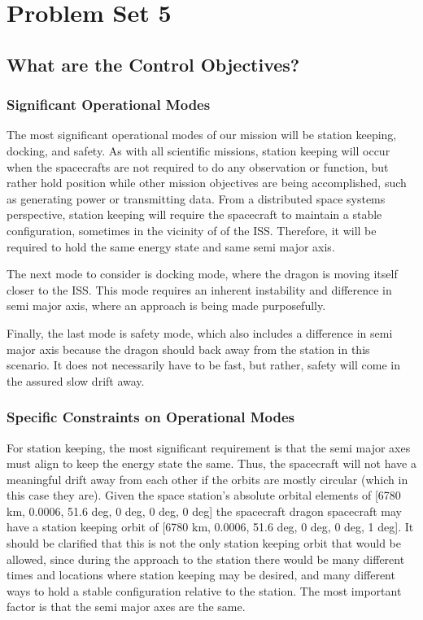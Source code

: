 \section{Problem Set 5}

\subsection{What are the Control Objectives?}

\subsubsection{Significant Operational Modes}
The most significant operational modes of our mission will be station keeping, docking, and safety. As with all scientific missions, station keeping will occur when the spacecrafts are not required to do any observation or function, but rather hold position while other mission objectives are being accomplished, such as generating power or transmitting data. From a distributed space systems perspective, station keeping will require the spacecraft to maintain a stable configuration, sometimes in the vicinity of of the ISS. Therefore, it will be required to hold the same energy state and same semi major axis.

The next mode to consider is docking mode, where the dragon is moving itself closer to the ISS. This mode requires an inherent instability and difference in semi major axis, where an approach is being made purposefully.

Finally, the last mode is safety mode, which also includes a difference in semi major axis because the dragon should back away from the station in this scenario. It does not necessarily have to be fast, but rather, safety will come in the assured slow drift away.

\subsubsection{Specific Constraints on Operational Modes}
For station keeping, the most significant requirement is that the semi major axes must align to keep the energy state the same. Thus, the spacecraft will not have a meaningful drift away from each other if the orbits are mostly circular (which in this case they are). Given the space station's absolute orbital elements of [6780 km, 0.0006, 51.6 deg, 0 deg, 0 deg, 0 deg] the spacecraft dragon spacecraft may have a station keeping orbit of [6780 km, 0.0006, 51.6 deg, 0 deg, 0 deg, 1 deg]. It should be clarified that this is not the only station keeping orbit that would be allowed, since during the approach to the station there would be many different times and locations where station keeping may be desired, and many different ways to hold a stable configuration relative to the station. The most important factor is that the semi major axes are the same.

